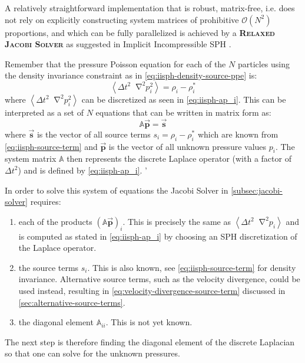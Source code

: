 \documentclass[oneside, a4paper]{book}
\newcommand\emphasis[1]{{\scshape\bfseries#1}}
\newcommand\angled[1]{\left\langle#1\right\rangle}
\newcommand*\Laplace{\mathop{}\!\mathbin\nabla^2}
\newcommand\vek[1]{\vec{\bm{#1}}}
\newcommand\br[1]{\left(#1\right)}
\begin{document}
    A relatively straightforward implementation that is robust, matrix-free, i.e. does not rely on explicitly constructing system matrices of prohibitive $\mathcal{O}\br{N^2}$ proportions, and which can be fully parallelized is achieved by a \emphasis{Relaxed Jacobi Solver} as suggested in Implicit Incompressible SPH \autocite[by Ihmsen et al.]{iisph}. 

    Remember that the pressure Poisson equation for each of the $N$ particles using the density invariance constraint as in \autoref{eq:iisph-density-source-ppe} is:
    \begin{equation}
      \angled{\Delta t^2 \Laplace p_i^2} = \rho_i-\rho_i^*
    \end{equation}
    where $\angled{\Delta t^2 \Laplace p_i^2}$ can be discretized as seen in \autoref{eq:iisph-ap_i}. This can be interpreted as a set of $N$ equations that can be written in matrix form as:
    \begin{equation}
      \mathds{A}\vek{p} = \vek{s}
    \end{equation}
    where $\vek{s}$ is the vector of all source terms $s_i= \rho_i-\rho_i^*$ which are known from \autoref{eq:iisph-source-term} and $\vek{p}$ is the vector of all unknown pressure values $p_i$. The system matrix $\mathds{A}$ then represents the discrete Laplace operator (with a factor of $\Delta t^2$) and is defined by \autoref{eq:iisph-ap_i}. '
    
    In order to solve this system of equations the Jacobi Solver in \autoref{subsec:jacobi-solver} requires:
    \begin{enumerate}
      \item each of the products $\br{\mathds{A}\vek{p}}_i$. This is precisely the same as $\angled{\Delta t^2\Laplace p_i}$ and is computed as stated in \autoref{eq:iisph-ap_i} by choosing an SPH discretization of the Laplace operator.
      \item the source terms $s_i$. This is also known, see \autoref{eq:iisph-source-term} for density invariance. Alternative source terms, such as the velocity divergence, could be used instead, resulting in \autoref{eq:velocity-divergence-source-term} discussed in \autoref{sec:alternative-source-terms}.
      \item the diagonal element $\mathds{A}_{ii}$. This is not yet known.
    \end{enumerate}
    The next step is therefore finding the diagonal element of the discrete Laplacian so that one can solve for the unknown pressures.
\end{document}
